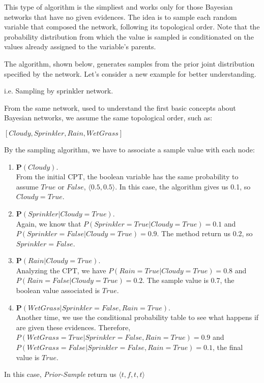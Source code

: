 This type of algorithm is the simpliest and works only for those Bayesian networks that have no given evidences. The idea is to sample each random variable that composed the
network, following its topological order. Note that the probability distribution from which the value is sampled is conditionated on the values already assigned to the 
variable's parents. \vspace{3.5pt}

The algorithm, shown below, generates samples from the prior joint distribution specified by the network. Let's consider a new example for better understanding.
\begin{example}
    i.e. Sampling by sprinkler network. \vspace{3.5pt}

    From the same network, used to understand the first basic concepts about Bayesian networks, we assume the same topological order, such as: \vspace{3.5pt}
    \begin{center}
        $[Cloudy, Sprinkler, Rain, WetGrass]$
    \end{center} \vspace{3.5pt}

    By the sampling algorithm, we have to associate a sample value with each node:
    \begin{enumerate}
        \item $\mathbf{P}(Cloudy)$. \\
        From the initial CPT, the boolean variable has the same probability to assume $True$ or $False$, $\langle 0.5, 0.5\rangle$. In this case, the algorithm gives us 0.1,
        so $Cloudy = True$.
        \item $\mathbf{P}(Sprinkler|Cloudy=True)$. \\
        Again, we know that $P(Sprinkler=True|Cloudy=True) = 0.1$ and $P(Sprinkler=False|Cloudy=True) = 0.9$. The method return us 0.2, so $Sprinkler = False$. 
        \item $\mathbf{P}(Rain|Cloudy=True)$. \\
        Analyzing the CPT, we have $P(Rain=True|Cloudy=True) = 0.8$ and $P(Rain=False|Cloudy=True) = 0.2$. The sample value is 0.7, the boolean value associated is 
        $True$.
        \item $\mathbf{P}(WetGrass|Sprinkler=False, Rain=True)$. \\
        Another time, we use the conditional probability table to see what happens if are given these evidences. Therefore, $P(WetGrass = True|Sprinkler=False, Rain=True) = 0.9$
        and $P(WetGrass=False|Sprinkler=False, Rain=True) = 0.1$, the final value is $True$. 
    \end{enumerate} 
    In this case, \textit{Prior-Sample} return us $\langle t,f,t,t \rangle$
\end{example}
